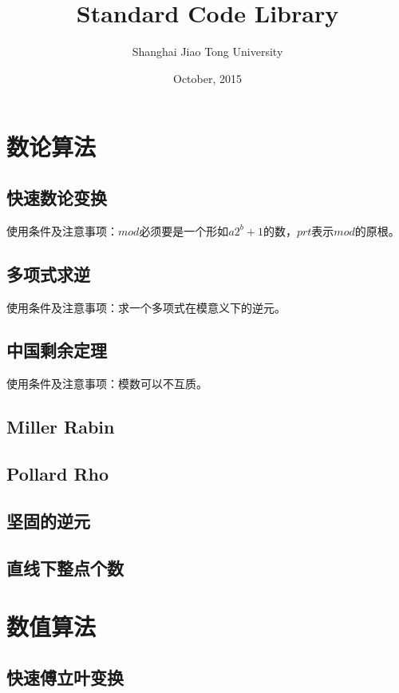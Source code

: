 \documentclass[openany, a4paper, 10pt]{book}
\begin{document}
	\title{\textbf{\LARGE{Standard Code Library}}}
	\author{Shanghai Jiao Tong University}
	\date{October, 2015}
	\maketitle
	\tableofcontents
	\begin{spacing}{1.0}
	\chapter{数论算法}
		\section{快速数论变换}
			使用条件及注意事项：$mod$必须要是一个形如$a2^b + 1$的数，$prt$表示$mod$的原根。
			
		\section{多项式求逆}
			使用条件及注意事项：求一个多项式在模意义下的逆元。
			
		\section{中国剩余定理}
			使用条件及注意事项：模数可以不互质。
			
		\section{Miller Rabin}
			
		\section{Pollard Rho}
			
		\section{坚固的逆元}
			
		\section{直线下整点个数}
			
	\chapter{数值算法}
		\section{快速傅立叶变换}
			

\end{spacing}
\end{document}
